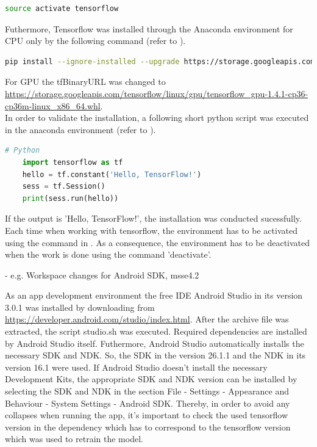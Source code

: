 \begin{lstlisting}[caption=Activating the Anaconda environment, label=list:activation_anaconda, language=bash]
	source activate tensorflow
\end{lstlisting}

Futhermore, Tensorflow was installed through the Anaconda environment for CPU only by the following command (refer to ).

\begin{lstlisting}[caption=Installing Tensorflow through Anaconda, label=list:installing_tensorflow_anaconda, language=bash]
	pip install --ignore-installed --upgrade https://storage.googleapis.com/tensorflow/linux/cpu/	tensorflow-1.4.1-cp36-cp36m-linux_x86_64.whl
\end{lstlisting}

For GPU the tfBinaryURL was changed to \url{https://storage.googleapis.com/tensorflow/linux/gpu/tensorflow_gpu-1.4.1-cp36-cp36m-linux_x86_64.whl}. \\

In order to validate the installation, a following short python script was executed in the anaconda environment (refer to ).

\begin{lstlisting}[caption=Installing Tensorflow through Anaconda, label=list:validation_installation, language=python]
	# Python
	import tensorflow as tf
	hello = tf.constant('Hello, TensorFlow!')
	sess = tf.Session()
	print(sess.run(hello))
\end{lstlisting}

If the output is 'Hello, TensorFlow!', the installation was conducted sucessfully. Each time when working with tensorflow, the environment has to be activated using the command in . As a consequence, the environment has to be deactivated when the work is done using the command 'deactivate'.

				- e.g. Workspace changes for Android SDK, msse4.2
				
As an app development environment the free IDE Android Studio in its version 3.0.1 was installed by downloading from \url{https://developer.android.com/studio/index.html}. After the archive file was extracted, the script studio.sh was executed. Required dependencies are installed by Android Studio itself. Futhermore, Android Studio automatically installs the necessary SDK and NDK. So, the SDK in the version 26.1.1 and the NDK in its version 16.1 were used. If Android Studio doesn't install the necessary Development Kits, the appropriate SDK and NDK version can be installed by selecting the SDK and NDK in the section File - Settings - Appearance and Behaviour - System Settings - Android SDK. Thereby, in order to avoid any collapses when running the app, it's important to check the used tensorflow version in the dependency which has to correspond to the tensorflow version which was used to retrain the model.\\





